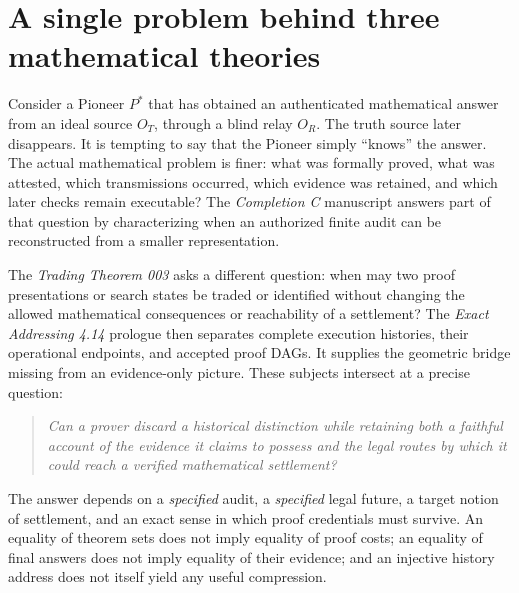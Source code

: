 \documentclass[11pt,letterpaper]{article}
\theoremstyle{definition}
\begin{document}
\section{A single problem behind three mathematical theories}
Consider a Pioneer $P^*$ that has obtained an authenticated mathematical answer from an ideal source $O_T$, through a blind relay $O_R$. The truth source later disappears. It is tempting to say that the Pioneer simply ``knows'' the answer. The actual mathematical problem is finer: what was formally proved, what was attested, which transmissions occurred, which evidence was retained, and which later checks remain executable? The \emph{Completion C} manuscript answers part of that question by characterizing when an authorized finite audit can be reconstructed from a smaller representation.

The \emph{Trading Theorem 003} asks a different question: when may two proof presentations or search states be traded or identified without changing the allowed mathematical consequences or reachability of a settlement? The \emph{Exact Addressing 4.14} prologue then separates complete execution histories, their operational endpoints, and accepted proof DAGs. It supplies the geometric bridge missing from an evidence-only picture. These subjects intersect at a precise question:
\begin{quote}\itshape
Can a prover discard a historical distinction while retaining both a faithful account of the evidence it claims to possess and the legal routes by which it could reach a verified mathematical settlement?
\end{quote}
The answer depends on a \emph{specified} audit, a \emph{specified} legal future, a target notion of settlement, and an exact sense in which proof credentials must survive. An equality of theorem sets does not imply equality of proof costs; an equality of final answers does not imply equality of their evidence; and an injective history address does not itself yield any useful compression.
\end{document}

